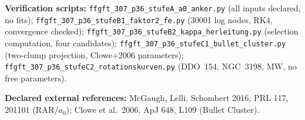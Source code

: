 \medskip
\noindent\textbf{Verification scripts:}
\texttt{ffgft\_307\_p36\_stufeA\_a0\_anker.py} (all inputs declared, no fits);
\texttt{ffgft\_307\_p36\_stufeB1\_faktor2\_fe.py} (30001 log nodes, RK4, convergence checked);
\texttt{ffgft\_307\_p36\_stufeB2\_kappa\_herleitung.py} (selection computation, four candidates);
\texttt{ffgft\_307\_p36\_stufeC1\_bullet\_cluster.py} (two-clump projection, Clowe+2006 parameters);
\texttt{ffgft\_307\_p36\_stufeC2\_rotationskurven.py} (DDO~154, NGC~3198, MW, no free parameters).

\medskip
\noindent\textbf{Declared external references:}
McGaugh, Lelli, Schombert 2016, PRL 117, 201101 (RAR/$a_0$);
Clowe et al.\ 2006, ApJ 648, L109 (Bullet Cluster).
